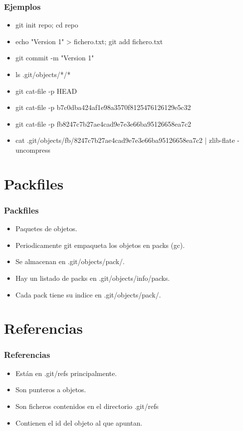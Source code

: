 \documentclass[10pt]{beamer}
\begin{document}
  \begin{frame}
    \frametitle{Ejemplos}
    \begin{itemize}
        \item git init repo; cd repo
        \item echo "Version 1" > fichero.txt; git add fichero.txt
        \item git commit -m "Version 1"
        \item ls .git/objects/*/*
        \item git cat-file -p HEAD
        \item git cat-file -p b7c0dba424af1e98a3570f8125476126129e5c32
        \item git cat-file -p fb8247c7b27ae4cad9e7e3e66ba95126658ea7c2
        \item cat .git/objects/fb/8247c7b27ae4cad9e7e3e66ba95126658ea7c2 | zlib-flate -uncompress
    \end{itemize}
  \end{frame}

  \section*{Packfiles}

  \begin{frame}
    \frametitle{Packfiles}
    \begin{itemize}
        \item Paquetes de objetos.
        \item Periodicamente git empaqueta los objetos en packs (gc).
        \item Se almacenan en .git/objects/pack/.
        \item Hay un listado de packs en .git/objects/info/packs.
        \item Cada pack tiene su indice en .git/objects/pack/.
    \end{itemize}
  \end{frame}

  \section*{Referencias}

  \begin{frame}
    \frametitle{Referencias}
    \begin{itemize}
        \item Están en .git/refs principalmente.
        \item Son punteros a objetos.
        \item Son ficheros contenidos en el directorio .git/refs
        \item Contienen el id del objeto al que apuntan.
    \end{itemize}
  \end{frame}
\end{document}

